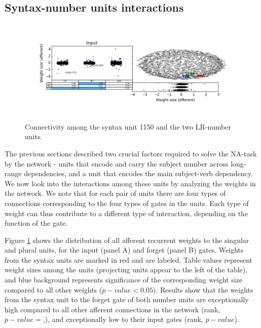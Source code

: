 \subsection{Syntax-number units interactions}

\begin{figure}[t]
    \centering 
    \includegraphics[width=\textwidth, height=5cm]{Figures/gate_Input_interactions.png}
\caption{Connectivity among the syntax unit 1150 and the two LR-number units.}
\label{fig:interaction}
\end{figure}

The previous sections described two crucial factors required to solve the NA-task by the network - units that encode and carry the subject number across long-range dependencies, and a unit that encodes the main subject-verb dependency. We now look into the interactions among these units by analyzing the weights in the network. We note that for each pair of units there are four types of connections corresponding to the four types of gates in the units. Each type of weight can thus contribute to a different type of interaction, depending on the function of the gate. 

Figure \ref{fig:interaction} shows the distribution of all afferent recurrent weights to the singular and plural units, for the input (panel A) and forget (panel B) gates. Weights from the syntax units are marked in red and are labeled. Table values represent weight sizes among the units (projecting units appear to the left of the table), and blue background represents significance of the corresponding weight size compared to all other weights ($p-value<0.05$). Results show that the weights from the syntax unit to the forget gate of both number units are exceptionally high compared to all other afferent connections in the network (rank, $p-value=$,), and exceptionally low to their input gates (rank, $p-value$). 


